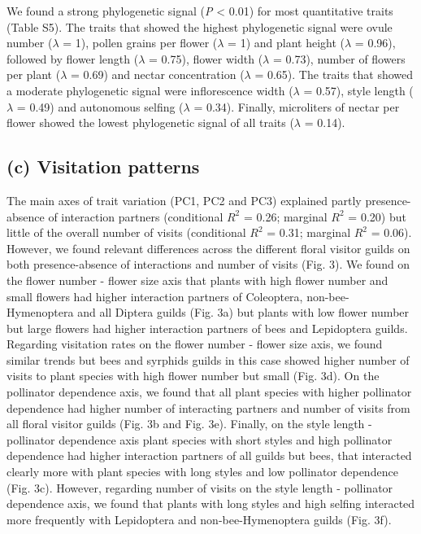 \documentclass[
  12pt,
  a4paper,
]{article}
\begin{document}
We found a strong phylogenetic signal (\emph{P} \textless{} 0.01) for most quantitative traits (Table S5). The traits that showed the highest phylogenetic signal were ovule number (\(\lambda\) = 1), pollen grains per flower (\(\lambda\) = 1) and plant height (\(\lambda\) = 0.96), followed by flower length (\(\lambda\) = 0.75), flower width (\(\lambda\) = 0.73), number of flowers per plant (\(\lambda\) = 0.69) and nectar concentration (\(\lambda\) = 0.65). The traits that showed a moderate phylogenetic signal were inflorescence width (\(\lambda\) = 0.57), style length (\(\lambda\) = 0.49) and autonomous selfing (\(\lambda\) = 0.34). Finally, microliters of nectar per flower showed the lowest phylogenetic signal of all traits (\(\lambda\) = 0.14).

\hypertarget{c-visitation-patterns}{%
\subsection{(c) Visitation patterns}\label{c-visitation-patterns}}

The main axes of trait variation (PC1, PC2 and PC3) explained partly presence-absence of interaction partners (conditional \(R^{2}\) = 0.26; marginal \(R^{2}\) = 0.20) but little of the overall number of visits (conditional \(R^{2}\) = 0.31; marginal \(R^{2}\) = 0.06). However, we found relevant differences across the different floral visitor guilds on both presence-absence of interactions and number of visits (Fig. 3). We found on the flower number - flower size axis that plants with high flower number and small flowers had higher interaction partners of Coleoptera, non-bee-Hymenoptera and all Diptera guilds (Fig. 3a) but plants with low flower number but large flowers had higher interaction partners of bees and Lepidoptera guilds. Regarding visitation rates on the flower number - flower size axis, we found similar trends but bees and syrphids guilds in this case showed higher number of visits to plant species with high flower number but small (Fig. 3d). On the pollinator dependence axis, we found that all plant species with higher pollinator dependence had higher number of interacting partners and number of visits from all floral visitor guilds (Fig. 3b and Fig. 3e). Finally, on the style length - pollinator dependence axis plant species with short styles and high pollinator dependence had higher interaction partners of all guilds but bees, that interacted clearly more with plant species with long styles and low pollinator dependence (Fig. 3c). However, regarding number of visits on the style length - pollinator dependence axis, we found that plants with long styles and high selfing interacted more frequently with Lepidoptera and non-bee-Hymenoptera guilds (Fig. 3f).
\end{document}

